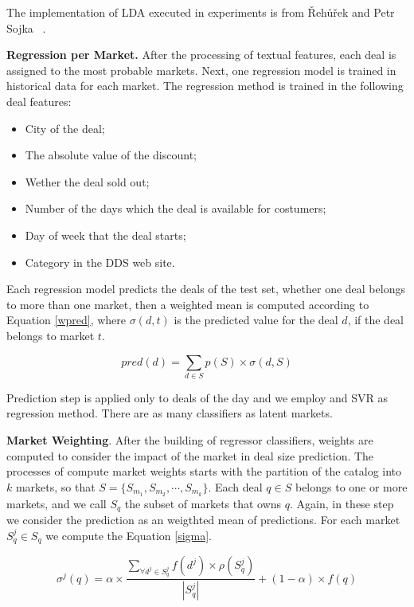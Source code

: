\documentclass{acm_proc_article-sp}
\begin{document}
The implementation of LDA executed in experiments is from 
{\v R}eh{\r u}{\v r}ek and Petr Sojka ~\cite{rehureklrec}.

\textbf{Regression per Market.} After the processing of textual features, 
each deal is assigned to 
the most probable markets. Next, one regression model is trained 
in historical data for each market. The regression method is trained in the 
following deal features:

\begin{itemize}
    \item City of the deal;
    \item The absolute value of the discount;
    \item Wether the deal sold out;
    \item Number of the days which the deal is available for costumers;
    \item Day of week that the deal starts;
    \item Category in the DDS web site.
\end{itemize}


Each regression model predicts 
the deals of the test set, whether one deal belongs to more than one 
market, then a weighted mean is computed according to Equation \ref{wpred}, 
where $\sigma(d,t)$ is the predicted value for the deal $d$, if the deal 
belongs to market $t$.

\begin{equation}
    pred(d) = \sum_{d \in S} p(S)\times \sigma(d,S)
    \label{wpred}
\end{equation}

Prediction step is applied 
only to deals of the day and we employ and SVR as 
regression method. 
There are as many classifiers as latent markets.

\textbf{Market Weighting}. After the building of regressor classifiers, 
weights are computed to consider the impact of the market in deal size 
prediction. The processes of compute market weights starts with the partition of 
the catalog into $k$ markets, so that $S =\{S_{m_1},S_{m_2},\cdots,S_{m_k}\}$.
Each deal $q \in S$ belongs to one or more markets, and we call $S_q$ the 
subset of markets that owns $q$. Again, in these step we consider the 
prediction as an weigthted mean of predictions. For each market $S^{j}_q \in S_q$ 
we compute the Equation \ref{sigma}.

\begin{equation}
    \sigma^j(q) = \alpha \times \frac{\sum\limits_{\forall d^j \in S^j_q} f(d^j) \times \rho(S^j_q)}{|S^j_q|} + (1 - \alpha) \times f(q)
    \label{sigma}
\end{equation}
\end{document}
